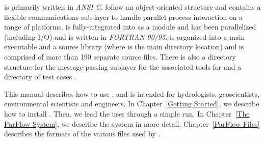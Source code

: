 \parflow{} is primarily written in \emph{ANSI C}, follow an object-oriented structure and contains a flexible communications sub-layer to handle parallel process interaction on a range of platforms.   is fully-integrated into \parflow{} as a module and has been parallelized (including I/O) and is written in \emph{FORTRAN 90/95}.  \parflow{} is organized into a main executable  and a source library  (where  is the main directory location) and is comprised of more than 190 separate source files.  There is also a directory structure for the message-passing sublayer  for the associated tools  for   and a directory of test cases .

This manual describes how to use \parflow{}, and is intended for
hydrologists, geoscientists, environmental scientists and engineers.  In
Chapter~\ref{Getting Started}, we describe how to install \parflow{}.
Then, we lead the user through a simple \parflow{} run.  In
Chapter~\ref{The ParFlow System}, we describe the \parflow{} system in
more detail.  Chapter~\ref{ParFlow Files} describes the formats of the
various files used by \parflow{}.

